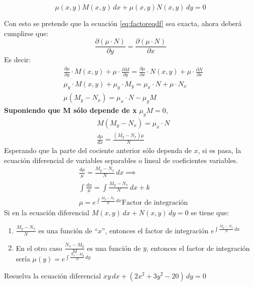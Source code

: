 \begin{equation}
    \mu (x,y)M(x,y)\, dx+\mu(x,y)N(x,y)\, dy=0
    \label{eq:factoreqdf}
\end{equation}

Con esto se pretende que la ecuación \eqref{eq:factoreqdf} sea exacta, ahora deberá
cumplirse que:
\begin{equation*}
    \frac{\partial (\mu \cdot N)}{\partial y}=\frac{\partial (\mu\cdot N)}{\partial x}
\end{equation*}
Es decir:
\begin{align*}
    &\frac{\partial\mu}{\partial y}\cdot M(x,y)+\mu \cdot \frac{\partial M}{\partial y}= \frac{\partial \mu}{\partial x}\cdot N(x,y)+\mu \cdot \frac{\partial N}{\partial x}\\
    &\mu_y \cdot M(x,y)+\mu_y \cdot M_y=\mu_x\cdot N+\mu\cdot N_x\\
    &\mu\left(M_y-N_x\right)=\mu_x\cdot N-\mu_yM
\end{align*}
\textbf{Suponiendo que M sólo depende de x} $\mu_y M=0$, 
\begin{align*}
    &M\left(M_y-N_x\right)=\mu_x\cdot N\\
    &\frac{d\mu}{dx}=\frac{\left(M_y-N_x\right)\mu}{N}
\end{align*}
Esperando que la parte del cociente anterior sólo dependa de $x$, si es pasa, la ecuación diferencial de variables separables o lineal de coeficientes variables.
\begin{align*}
    &\frac{d\mu}{\mu}=\frac{M_y-N_x}{N}\, dx\implies \\
    &\int \frac{du}{\mu}=\int \frac{M_y-N_x}{N}\, dx+k\\
    &\mu =e^{\int \frac{M_y-N_x}{N}\, dx} \text{Factor de integración}
\end{align*}
Si en la ecuación diferencial $M(x,y)\, dx+N(x,y)\, dy=0$ se tiene que: 
\begin{enumerate}
    \item $\frac{M_y-N_x}{N}$ es una función de ``$x$'', entonces el factor de integración $e^{\int \frac{M_y-N_x}{N}\, dx}$
    \item En el otro caso $\frac{N_x-M_y}{M}$ es una función de $y$, entonces el factor de integración sería $\mu(y)=e^{\int \frac{N_x-M_y}{N}\, dy}$
\end{enumerate}
\begin{example}
    Resuelva la ecuación diferencial $xy\, dx+\left(2x^2+3y^2-20\right)\, dy=0$
\end{example}

